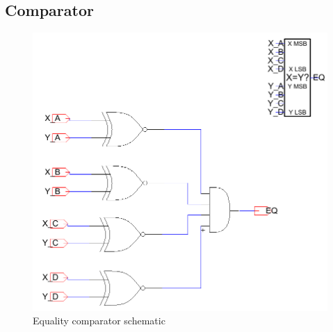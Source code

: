 \documentclass[12pt]{report}
\begin{document}
\subsection*{Comparator}
\begin{figure}[H]
  \centering
    \includegraphics[width=1.0\textwidth]{Schematics/comparator_schematic.PNG}
  \caption{Equality comparator schematic}
  \label{fig:comparator_schematic}
\end{figure}
\end{document}
